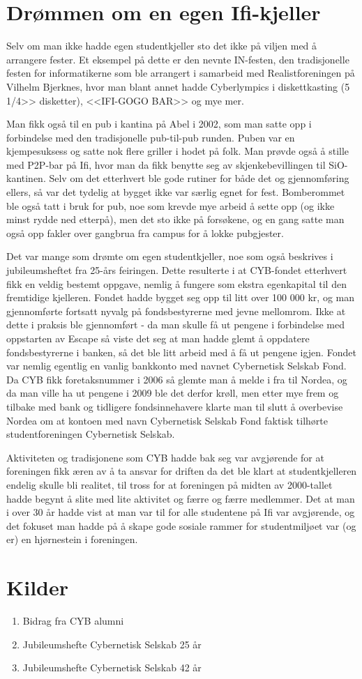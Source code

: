 \newpage

\section{Drømmen om en egen Ifi-kjeller}

Selv om man ikke hadde egen studentkjeller sto det ikke på viljen med å arrangere fester. Et eksempel på dette er den nevnte IN-festen, den tradisjonelle festen for informatikerne som ble arrangert i samarbeid med Realistforeningen på Vilhelm Bjerknes, hvor man blant annet hadde Cyberlympics i diskettkasting (5 1/4>> disketter), <<IFI-GOGO BAR>> og mye mer.

Man fikk også til en pub i kantina på Abel i 2002, som man satte opp i forbindelse med den tradisjonelle pub-til-pub runden. Puben var en kjempesuksess og satte nok flere griller i hodet på folk. Man prøvde også å stille med P2P-bar på Ifi, hvor man da fikk benytte seg av skjenkebevillingen til SiO-kantinen. Selv om det etterhvert ble gode rutiner for både det og gjennomføring ellers, så var det tydelig at bygget ikke var særlig egnet for fest. Bomberommet ble også tatt i bruk for pub, noe som krevde mye arbeid å sette opp (og ikke minst rydde ned etterpå), men det sto ikke på forsøkene, og en gang satte man også opp fakler over gangbrua fra campus for å lokke pubgjester.

Det var mange som drømte om egen studentkjeller, noe som også beskrives i jubileumsheftet fra 25-års feiringen. Dette resulterte i at CYB-fondet etterhvert fikk en veldig bestemt oppgave, nemlig å fungere som ekstra egenkapital til den fremtidige kjelleren. Fondet hadde bygget seg opp til litt over 100 000 kr, og man gjennomførte fortsatt nyvalg på fondsbestyrerne med jevne mellomrom. Ikke at dette i praksis ble gjennomført - da man skulle få ut pengene i forbindelse med oppstarten av Escape så viste det seg at man hadde glemt å oppdatere fondsbestyrerne i banken, så det ble litt arbeid med å få ut pengene igjen. Fondet var nemlig egentlig en vanlig bankkonto med navnet Cybernetisk Selskab Fond. Da CYB fikk foretaksnummer i 2006 så glemte man å melde i fra til Nordea, og da man ville ha ut pengene i 2009 ble det derfor krøll, men etter mye frem og tilbake med bank og tidligere fondsinnehavere klarte man til slutt å overbevise Nordea om at kontoen med navn Cybernetisk Selskab Fond faktisk tilhørte studentforeningen Cybernetisk Selskab.

Aktiviteten og tradisjonene som CYB hadde bak seg var avgjørende for at foreningen fikk æren av å ta ansvar for driften da det ble klart at studentkjelleren endelig skulle bli realitet, til tross for at foreningen på midten av 2000-tallet hadde begynt å slite med lite aktivitet og færre og færre medlemmer. Det at man i over 30 år hadde vist at man var til for alle studentene på Ifi var avgjørende, og det fokuset man hadde på å skape gode sosiale rammer for studentmiljøet var (og er) en hjørnestein i foreningen.

\section*{Kilder}

\begin{enumerate}
	\item Bidrag fra CYB alumni
	\item Jubileumshefte Cybernetisk Selskab 25 år
	\item Jubileumshefte Cybernetisk Selskab 42 år
\end{enumerate}
